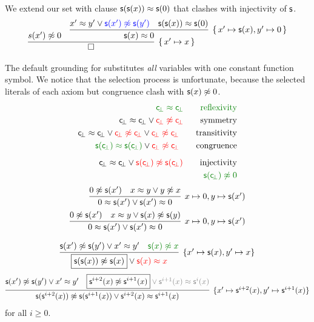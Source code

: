 \begin{example} We extend our set with clause \( \mathsf{s}(\mathsf{s}(x))\approx\mathsf{s}(0) \)
	that clashes with injectivity of \( \mathsf{s} \).
	\begin{gather*}
	\infer[ \{ \, x'\mapsto x \, \}]
	{\square}
	{s(x')\mNE 0 &
		\infer[
		 \{ \, x'\mapsto \msucc(x), y'\mapsto 0 \, \}
		]{
			\msucc(x)\mEQ 0
		}{
			x' \mEQ y' \lor {\colN \msucc(x') \mNE \msucc(y')}
			& {\msucc(\msucc(x))\mEQ\msucc(0)}
		}
	}
	\end{gather*}
\end{example}

\begin{example}\label{ex:nat:instgen}
	The default grounding for \InstGen{} substitutes \emph{all} variables with one constant function symbol.
	We notice that the selection process is unfortunate,
	because the selected  literals of each axiom but congruence clash with \( \mathsf{s}(x)\not\approx 0 \).
	\begin{align*}
	\colHi \consbot \mEQ \consbot
	\tag*{reflexivity}\\
	{ \consbot \mEQ \consbot} \lor {\colLo \consbot \mNE \consbot}
	\tag*{symmetry}\\
	{ \consbot \mEQ \consbot}
	\lor {\colLo \consbot \mNE \consbot}
	\lor {\colLo \consbot\mNE \consbot}
	\tag*{transitivity}\\
	{\colHi \msucc(\consbot) \mEQ \msucc(\consbot)} \lor {\colLo \consbot \mNE \consbot}
	\tag*{congruence}\\[0.5em]
	{ \consbot \mEQ \consbot} \lor {\colLo \msucc(\consbot) \mNE \msucc(\consbot)}
	\tag*{injectivity}\\
	{\colHi \msucc(\consbot) \mNE 0}
	\end{align*}
	\begin{align*}
	\infer[x\mapsto 0, y\mapsto \msucc(x') ]
	{ 0\mEQ\msucc(x')\lor \msucc(x')\mEQ 0}
	{
		0 \mNE\msucc(x')
		&
		x\mEQ y\lor y\mNE x
	}
\\
%
\infer[x\mapsto 0, y\mapsto \msucc(x') ]
{ 0\mEQ\msucc(x')\lor \msucc(x')\mEQ 0}
{
	0 \mNE \msucc(x')
	&
	x \mEQ y \lor \msucc(x)\mNE \msucc(y)
}
	\end{align*}
\end{example}

	\begin{gather*}
	\infer[ \{ x'\mapsto \msucc (x), y'\mapsto x\}]{
		\boxed{\msucc (\msucc (x)) \mNE \msucc (x)} \lor\colLo \msucc (x)\mEQ x
	}{
		\msucc (x') \mNE \msucc (y') \lor x'\mEQ y' & \colHi\msucc (x) \mNE x
	}
	\end{gather*}
	\begin{gather*}
	\infer[ \{ x'\mapsto \msucc^{i+2} (x), y'\mapsto \msucc^{i+1} (x)\}]{
		\msucc (\msucc^{i+2} (x)) \mNE \msucc (\msucc^{i+1} (x)) \lor \msucc^{i+2} (x)\mEQ\msucc^{i+1} (x)
	}{
		\msucc (x') \mNE \msucc (y') \lor x'\mEQ y' & \boxed{\msucc^{i+2} (x) \mNE \msucc^{i+1} (x)}\colG \lor \msucc^{i+1} (x)\mEQ\msucc^{i}(x)
	}
	\end{gather*}
	for all \( i\geq 0 \).

